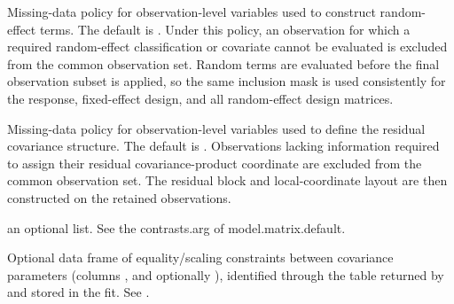 \documentclass[a4paper]{book}
\begin{document}
\begin{Arguments}
\begin{ldescription}
\item[\code{naMethodRandom}] Missing-data policy for observation-level variables used to
construct random-effect terms. The default is . Under this policy,
an observation for which a required random-effect classification or covariate cannot
be evaluated is excluded from the common observation set. Random terms are evaluated
before the final observation subset is applied, so the same inclusion mask is used
consistently for the response, fixed-effect design, and all random-effect design
matrices.

\item[\code{naMethodR}] Missing-data policy for observation-level variables used to define
the residual covariance structure. The default is . Observations
lacking information required to assign their residual covariance-product coordinate
are excluded from the common observation set. The residual block and local-coordinate
layout are then constructed on the retained observations.

\item[\code{contrasts}] an optional list. See the contrasts.arg of model.matrix.default.
\item[\code{vcc}] Optional data frame of equality/scaling constraints between
covariance parameters (columns ,  and optionally
), identified through the  table returned by
 and stored in the fit. See .


\end{ldescription}
\end{Arguments}
\end{document}
